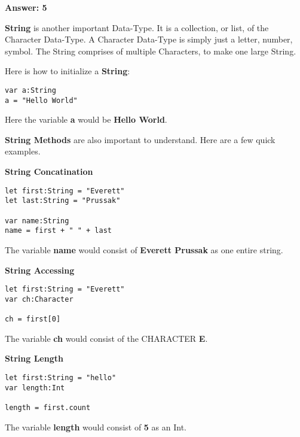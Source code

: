 \documentclass{article}
\theoremstyle{theorem}
\theoremstyle{definition}
\theoremstyle{remark}
\begin{document}
\noindent\newline\textbf{Answer: 5}


\noindent\newline\newline\textbf{String} is another important Data-Type. It is a collection, or list, of the Character Data-Type. A Character Data-Type is simply just a letter, number, symbol. The String comprises of multiple Characters, to make one large String.

\noindent\newline Here is how to initialize a \textbf{String}:
\begin{verbatim}
var a:String
a = "Hello World"
\end{verbatim}

\noindent\newline Here the variable \textbf{a} would be \textbf{Hello World}. 

\noindent\newline\textbf{String Methods} are also important to understand. Here are a few quick examples.

\noindent\newline \textbf{String Concatination}
\begin{verbatim}
let first:String = "Everett"
let last:String = "Prussak"

var name:String
name = first + " " + last
\end{verbatim}
\noindent\newline The variable \textbf{name} would consist of \textbf{Everett Prussak} as one entire string.

\noindent\newline \textbf{String Accessing}
\begin{verbatim}
let first:String = "Everett"
var ch:Character

ch = first[0]
\end{verbatim}
\noindent\newline The variable \textbf{ch} would consist of the CHARACTER \textbf{E}.

\noindent\newline \textbf{String Length}
\begin{verbatim}
let first:String = "hello"
var length:Int

length = first.count
\end{verbatim}
\noindent\newline The variable \textbf{length} would consist of \textbf{5} as an Int.
\end{document}
